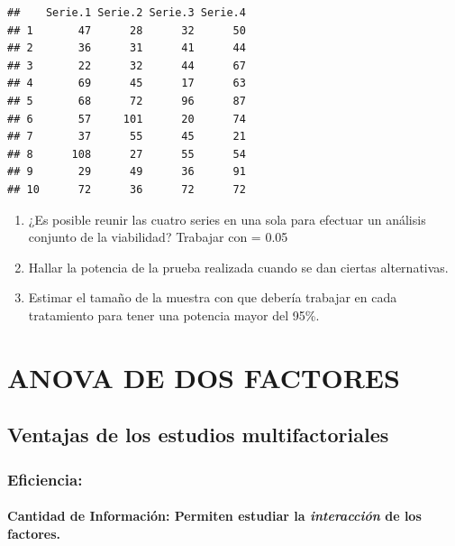 \documentclass[]{book}
\providecommand{\tightlist}{%
  \setlength{\itemsep}{0pt}\setlength{\parskip}{0pt}}
\theoremstyle{definition}
\theoremstyle{definition}
\theoremstyle{definition}
\theoremstyle{remark}
\begin{document}
\begin{verbatim}
##    Serie.1 Serie.2 Serie.3 Serie.4
## 1       47      28      32      50
## 2       36      31      41      44
## 3       22      32      44      67
## 4       69      45      17      63
## 5       68      72      96      87
## 6       57     101      20      74
## 7       37      55      45      21
## 8      108      27      55      54
## 9       29      49      36      91
## 10      72      36      72      72
\end{verbatim}

\begin{enumerate}
\def\labelenumi{\alph{enumi}.}
\tightlist
\item
  ¿Es posible reunir las cuatro series en una sola para efectuar un
  análisis conjunto de la viabilidad? Trabajar con = 0.05
\item
  Hallar la potencia de la prueba realizada cuando se dan ciertas
  alternativas.
\item
  Estimar el tamaño de la muestra con que debería trabajar en cada
  tratamiento para tener una potencia mayor del 95\%.
\end{enumerate}

\hypertarget{anova-de-dos-factores}{%
\chapter{ANOVA DE DOS FACTORES}\label{anova-de-dos-factores}}

\hypertarget{ventajas-de-los-estudios-multifactoriales}{%
\section{Ventajas de los estudios
multifactoriales}\label{ventajas-de-los-estudios-multifactoriales}}

\hypertarget{eficiencia}{%
\subsection{Eficiencia:}\label{eficiencia}}

\hypertarget{cantidad-de-informacion-permiten-estudiar-la-interaccion-de-los-factores.}{%
\subsubsection{\texorpdfstring{Cantidad de Información: Permiten
estudiar la \emph{interacción} de los
factores.}{Cantidad de Información: Permiten estudiar la interacción de los factores.}}\label{cantidad-de-informacion-permiten-estudiar-la-interaccion-de-los-factores.}}
\end{document}
